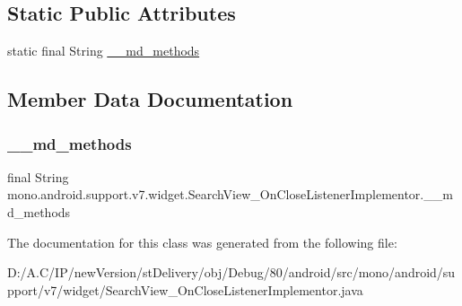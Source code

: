 \subsection*{Static Public Attributes}
\begin{DoxyCompactItemize}
\item 
static final String \hyperlink{classmono_1_1android_1_1support_1_1v7_1_1widget_1_1_search_view___on_close_listener_implementor_ade24b40287e42469422f6653a871f026}{\+\_\+\+\_\+md\+\_\+methods}
\end{DoxyCompactItemize}


\subsection{Member Data Documentation}
\mbox{\label{classmono_1_1android_1_1support_1_1v7_1_1widget_1_1_search_view___on_close_listener_implementor_ade24b40287e42469422f6653a871f026}} 
\subsubsection{\texorpdfstring{\+\_\+\+\_\+md\+\_\+methods}{\_\_md\_methods}}
{\footnotesize\ttfamily final String mono.\+android.\+support.\+v7.\+widget.\+Search\+View\+\_\+\+On\+Close\+Listener\+Implementor.\+\_\+\+\_\+md\+\_\+methods\hspace{0.3cm}{\ttfamily [static]}}



The documentation for this class was generated from the following file\+:\begin{DoxyCompactItemize}
\item 
D\+:/\+A.\+C/\+I\+P/new\+Version/st\+Delivery/obj/\+Debug/80/android/src/mono/android/support/v7/widget/Search\+View\+\_\+\+On\+Close\+Listener\+Implementor.\+java\end{DoxyCompactItemize}
